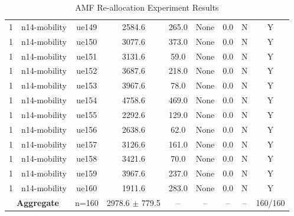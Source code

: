 \begin{table}[ht]
\begin{tabular}{|c|c|c|c|c|c|c|c|c|}
1 & n14-mobility & ue149 & 2584.6 & 265.0 & None & 0.0 & N & Y \\
1 & n14-mobility & ue150 & 3077.6 & 373.0 & None & 0.0 & N & Y \\
1 & n14-mobility & ue151 & 3131.6 & 59.0 & None & 0.0 & N & Y \\
1 & n14-mobility & ue152 & 3687.6 & 218.0 & None & 0.0 & N & Y \\
1 & n14-mobility & ue153 & 3967.6 & 78.0 & None & 0.0 & N & Y \\
1 & n14-mobility & ue154 & 4758.6 & 469.0 & None & 0.0 & N & Y \\
1 & n14-mobility & ue155 & 2292.6 & 129.0 & None & 0.0 & N & Y \\
1 & n14-mobility & ue156 & 2638.6 & 62.0 & None & 0.0 & N & Y \\
1 & n14-mobility & ue157 & 3126.6 & 161.0 & None & 0.0 & N & Y \\
1 & n14-mobility & ue158 & 3421.6 & 70.0 & None & 0.0 & N & Y \\
1 & n14-mobility & ue159 & 3967.6 & 237.0 & None & 0.0 & N & Y \\
1 & n14-mobility & ue160 & 1911.6 & 283.0 & None & 0.0 & N & Y \\
\multicolumn{2}{|c|}{\textbf{Aggregate}} & n=160 & 2978.6 $\pm$ 779.5 & -- & -- & -- & -- & 160/160 \\
\hline
\end{tabular}
\caption{AMF Re-allocation Experiment Results}
\label{tab:amf_realloc}
\end{table}
